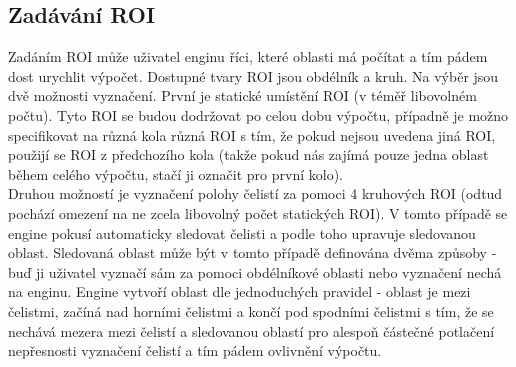 \documentclass[a4paper,12pt]{article}
\begin{document}
\subsection{Zadávání ROI}
\begin{figure}[H]
\end{figure}
Zadáním ROI může uživatel enginu říci, které oblasti má počítat a tím pádem dost urychlit výpočet. Dostupné tvary ROI jsou obdélník a kruh. Na výběr jsou dvě možnosti vyznačení. První je statické umístění ROI (v téměř libovolném počtu). Tyto ROI se budou dodržovat po celou dobu výpočtu, případně je možno specifikovat na různá kola různá ROI s tím, že pokud nejsou uvedena jiná ROI, použijí se ROI z předchozího kola (takže pokud nás zajímá pouze jedna oblast během celého výpočtu, stačí ji označit pro první kolo).\\
Druhou možností je vyznačení polohy čelistí za pomoci 4 kruhových ROI (odtud pochází omezení na ne zcela libovolný počet statických ROI). V tomto případě se engine pokusí automaticky sledovat čelisti a podle toho upravuje sledovanou oblast. Sledovaná oblast může být v tomto případě definována dvěma způsoby - buď ji uživatel vyznačí sám za pomoci obdélníkové oblasti nebo vyznačení nechá na enginu. Engine vytvoří oblast dle jednoduchých pravidel - oblast je mezi čelistmi, začíná nad horními čelistmi a končí pod spodními čelistmi s tím, že se nechává mezera mezi čelistí a sledovanou oblastí pro alespoň částečné potlačení nepřesnosti vyznačení čelistí a tím pádem ovlivnění výpočtu.
\end{document}
